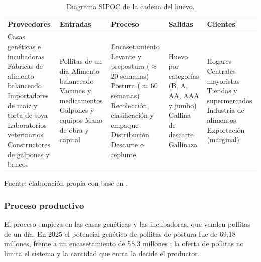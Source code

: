 \documentclass[preprint,12pt,authoryear]{elsarticle}
\begin{document}
\begin{table}[!htbp]
\centering
\caption{Diagrama SIPOC de la cadena del huevo.}
\label{tab:sipoc}
\footnotesize
\setlength{\tabcolsep}{4pt}
\begin{tabularx}{\textwidth}{@{}LLLLL@{}}
\toprule
Proveedores & Entradas & Proceso & Salidas & Clientes \\
\midrule
Casas genéticas e incubadoras\newline
Fábricas de alimento balanceado\newline
Importadores de maíz y torta de soya\newline
Laboratorios veterinarios\newline
Constructores de galpones y bancos
&
Pollitas de un día\newline
Alimento balanceado\newline
Vacunas y medicamentos\newline
Galpones y equipos\newline
Mano de obra y capital
&
Encasetamiento\newline
Levante y prepostura ($\approx$\,20 semanas)\newline
Postura ($\approx$\,60 semanas)\newline
Recolección, clasificación y empaque\newline
Distribución\newline
Descarte o replume
&
Huevo por categorías (B, A, AA, AAA y jumbo)\newline
Gallina de descarte\newline
Gallinaza
&
Hogares\newline
Centrales mayoristas\newline
Tiendas y supermercados\newline
Industria de alimentos\newline
Exportación (marginal) \\
\bottomrule
\end{tabularx}

\smallskip
{\footnotesize\raggedright Fuente: elaboración propia con base en \citet{Fenavi2026Fenaviquin440}.\par}
\end{table}

\subsubsection{Proceso productivo}

El proceso empieza en las casas genéticas y las incubadoras, que venden pollitas de un día. En 2025 el potencial genético de pollitas de postura fue de 69,18 millones, frente a un encasetamiento de 58,3 millones \citep{Fenavi2026Fenaviquin456}; la oferta de pollitas no limita el sistema y la cantidad que entra la decide el productor.
\end{document}
